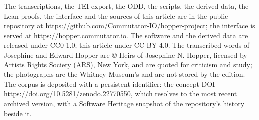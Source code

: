 \documentclass[11pt]{article}
\begin{document}
The transcriptions, the TEI export, the ODD, the scripts, the derived data, the Lean proofs, the interface and the sources of this article are in the public repository at \url{https://github.com/Commutator-IO/hopper-project}; the interface is served at \url{https://hopper.commutator.io}. The software and the derived data are released under CC0 1.0; this article under CC BY 4.0. The transcribed words of Josephine and Edward Hopper are © Heirs of Josephine N. Hopper, licensed by Artists Rights Society (ARS), New York, and are quoted for criticism and study; the photographs are the Whitney Museum's and are not stored by the edition. The corpus is deposited with a persistent identifier: the concept DOI \url{https://doi.org/10.5281/zenodo.22770550}, which resolves to the most recent archived version, with a Software Heritage snapshot of the repository's history beside it.
\end{document}
